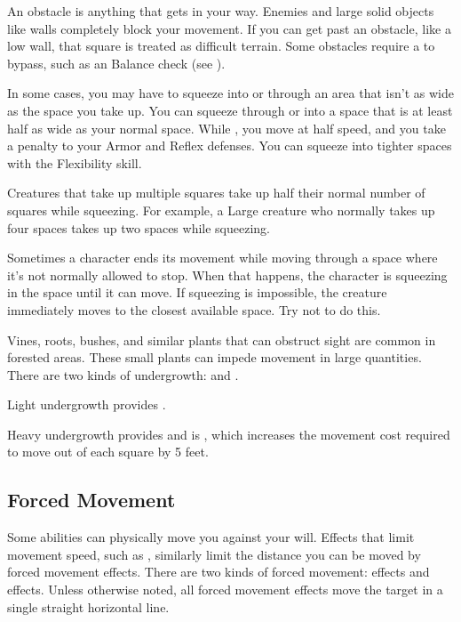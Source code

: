         An obstacle is anything that gets in your way. Enemies and large solid objects like walls completely block your movement. If you can get past an obstacle, like a low wall, that square is treated as difficult terrain. Some obstacles require a  to bypass, such as an Balance check (see ).

        In some cases, you may have to squeeze into or through an area that isn't as wide as the space you take up.
        You can squeeze through or into a space that is at least half as wide as your normal space.
        While \squeezing, you move at half speed, and you take a  penalty to your Armor and Reflex defenses.
        You can squeeze into tighter spaces with the Flexibility skill.

        Creatures that take up multiple squares take up half their normal number of squares while squeezing. For example, a Large creature who normally takes up four spaces takes up two spaces while squeezing.

         Sometimes a character ends its movement while moving through a space where it's not normally allowed to stop. When that happens, the character is squeezing in the space until it can move. If squeezing is impossible, the creature immediately moves to the closest available space. Try not to do this.

         Vines, roots, bushes, and similar plants that can obstruct sight are common in forested areas.
        These small plants can impede movement in large quantities.
        There are two kinds of undergrowth:  and .

        Light undergrowth provides .

        Heavy undergrowth provides  and is , which increases the movement cost required to move out of each square by 5 feet.

    \subsection{Forced Movement}\label{Forced Movement}
        Some abilities can physically move you against your will.
        Effects that limit movement speed, such as , similarly limit the distance you can be moved by forced movement effects.
        There are two kinds of forced movement:  effects and  effects.
        Unless otherwise noted, all forced movement effects move the target in a single straight horizontal line.

